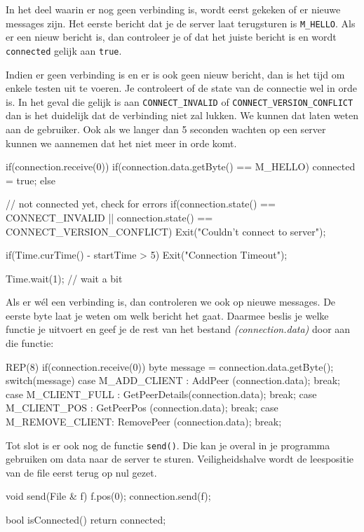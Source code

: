 In het deel waarin er nog geen verbinding is, wordt eerst gekeken of er nieuwe messages zijn. Het eerste bericht dat je de server laat terugsturen is \texttt{M\_HELLO}. Als er een nieuw bericht is, dan controleer je of dat het juiste bericht is en wordt \texttt{connected} gelijk aan \texttt{true}.

Indien er geen verbinding is en er is ook geen nieuw bericht, dan is het tijd om enkele testen uit te voeren. Je controleert of de state van de connectie wel in orde is. In het geval die gelijk is aan \texttt{CONNECT\_INVALID} of \texttt{CONNECT\_VERSION\_CONFLICT} dan is het duidelijk dat de verbinding niet zal lukken. We kunnen dat laten weten aan de gebruiker. Ook als we langer dan 5 seconden wachten op een server kunnen we aannemen dat het niet meer in orde komt. 

\begin{code}
if(connection.receive(0))
{
	if(connection.data.getByte() == M_HELLO) connected = true;
} else
{
	// not connected yet, check for errors
	if(connection.state() == CONNECT_INVALID || connection.state() == CONNECT_VERSION_CONFLICT)
	{
		 Exit("Couldn't connect to server");
	}
	
	if(Time.curTime() - startTime > 5)
	{
		 Exit("Connection Timeout");
	}
	
	Time.wait(1); // wait a bit
}
\end{code}

Als er w\'el een verbinding is, dan controleren we ook op nieuwe messages. De eerste byte laat je weten om welk bericht het gaat. Daarmee beslis je welke functie je uitvoert en geef je de rest van het bestand \textsl{(connection.data)} door aan die functie:

\begin{code}
REP(8) if(connection.receive(0))
{
	byte message = connection.data.getByte();
	switch(message)
	{
		 case M_ADD_CLIENT   : AddPeer       (connection.data); break;            
		 case M_CLIENT_FULL  : GetPeerDetails(connection.data); break;               
		 case M_CLIENT_POS   : GetPeerPos    (connection.data); break;              
		 case M_REMOVE_CLIENT: RemovePeer    (connection.data); break;
	}
}
\end{code}



Tot slot is er ook nog de functie \texttt{send()}. Die kan je overal in je programma gebruiken om data naar de server te sturen. Veiligheidshalve wordt de leespositie van de file eerst terug op nul gezet.

\begin{code}
void send(File & f)
{
   f.pos(0); 
   connection.send(f);
}

bool isConnected() {
  return connected;
}
\end{code}

